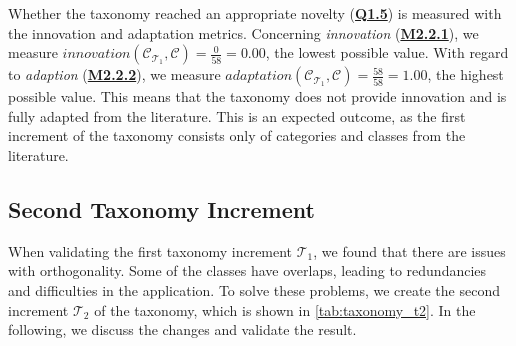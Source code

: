 \begin{sloppypar}
Whether the taxonomy reached an appropriate novelty (\hyperref[tab:gqm_taxonomy_validation]{\textbf{Q1.5}}) is measured with the innovation and adaptation metrics. Concerning \emph{innovation} (\hyperref[tab:gqm_taxonomy_validation]{\textbf{M2.2.1}}), we measure $innovation(\mathcal{C}_{\mathcal{T}_1}, \mathcal{C}) = \frac{0}{58} = 0.00$, the lowest possible value. With regard to \emph{adaption} (\hyperref[tab:gqm_taxonomy_validation]{\textbf{M2.2.2}}), we measure $adaptation(\mathcal{C}_{\mathcal{T}_1}, \mathcal{C}) = \frac{58}{58} = 1.00$, the highest possible value. This means that the taxonomy does not provide innovation and is fully adapted from the literature. This is an expected outcome, as the first increment of the taxonomy consists only of categories and classes from the literature.
\end{sloppypar}


\subsection{Second Taxonomy Increment}

When validating the first taxonomy increment $\mathcal{T}_1$, we found that there are issues with orthogonality. Some of the classes have overlaps, leading to redundancies and difficulties in the application. To solve these problems, we create the second increment $\mathcal{T}_2$ of the taxonomy, which is shown in \autoref{tab:taxonomy_t2}. In the following, we discuss the changes and validate the result.

